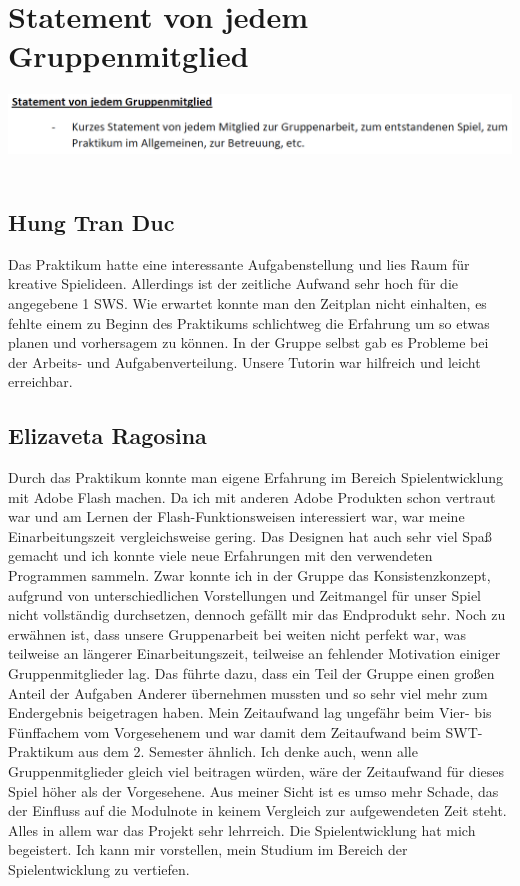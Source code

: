 \documentclass[a4paper, 11pt]{article} %
\begin{document}
\section{Statement von jedem Gruppenmitglied}
\includegraphics[scale=0.5]{images/statement.png}\\\\
\subsection{Hung Tran Duc}
Das Praktikum hatte eine interessante Aufgabenstellung und lies Raum für kreative Spielideen.
Allerdings ist der zeitliche Aufwand sehr hoch für die angegebene 1 SWS.
Wie erwartet konnte man den Zeitplan nicht einhalten, es fehlte einem zu Beginn des Praktikums schlichtweg 
die Erfahrung um so etwas planen und vorhersagem zu können.
In der Gruppe selbst gab es Probleme bei der Arbeits- und Aufgabenverteilung.
Unsere Tutorin war hilfreich und leicht erreichbar.
\subsection{Elizaveta Ragosina}
Durch das Praktikum konnte man eigene Erfahrung im Bereich Spielentwicklung mit Adobe Flash machen. Da ich mit anderen Adobe Produkten schon vertraut war und am Lernen der Flash-Funktionsweisen interessiert war, war meine Einarbeitungszeit vergleichsweise gering. Das Designen hat auch sehr viel Spaß gemacht und ich konnte viele neue Erfahrungen mit den verwendeten Programmen sammeln. Zwar konnte ich in der Gruppe das Konsistenzkonzept, aufgrund von unterschiedlichen Vorstellungen und Zeitmangel für unser Spiel nicht vollständig durchsetzen, dennoch gefällt mir das Endprodukt sehr.
Noch zu erwähnen ist, dass unsere Gruppenarbeit bei weiten nicht perfekt war, was teilweise an längerer Einarbeitungszeit, teilweise an fehlender Motivation einiger Gruppenmitglieder lag. Das führte dazu, dass ein Teil der Gruppe einen großen Anteil der Aufgaben Anderer übernehmen mussten und so sehr viel mehr zum Endergebnis beigetragen haben. Mein Zeitaufwand lag ungefähr beim Vier- bis Fünffachem vom Vorgesehenem und war damit dem Zeitaufwand beim SWT-Praktikum aus dem 2. Semester ähnlich. Ich denke auch, wenn alle Gruppenmitglieder gleich viel beitragen würden, wäre der Zeitaufwand für dieses Spiel höher als der Vorgesehene. Aus meiner Sicht ist es umso mehr Schade, das der Einfluss auf die Modulnote in keinem Vergleich zur aufgewendeten Zeit steht. \\
Alles in allem war das Projekt sehr lehrreich. Die Spielentwicklung hat mich begeistert. Ich kann mir vorstellen, mein Studium im Bereich der Spielentwicklung zu vertiefen.
\end{document}
